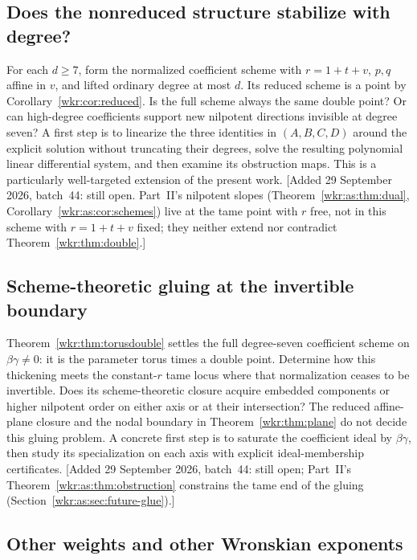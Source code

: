 \documentclass[11pt,a4paper]{article}
\numberwithin{equation}{section}
\theoremstyle{definition}
\theoremstyle{remark}
\begin{document}
\subsection{Does the nonreduced structure stabilize with degree?}
\label{wkr:as:q:stabilize}%

For each $d\ge7$, form the normalized coefficient scheme with
$r=1+t+v$, $p,q$ affine in $v$, and lifted ordinary degree at most $d$.
Its reduced scheme is a point by Corollary~\ref{wkr:cor:reduced}. Is the full
scheme always the same double point? Or can high-degree coefficients
support new nilpotent directions invisible at degree seven? A first step
is to linearize the three identities in $(A,B,C,D)$ around the explicit
solution without truncating their degrees, solve the resulting polynomial
linear differential system, and then examine its obstruction maps.
This is a particularly well-targeted extension of the present work.
[Added 29 September 2026, batch~44: still open. Part~II's nilpotent
slopes (Theorem~\ref{wkr:as:thm:dual},
Corollary~\ref{wkr:as:cor:schemes}) live at the tame point with $r$ free,
not in this scheme with $r=1+t+v$ fixed; they neither extend nor
contradict Theorem~\ref{wkr:thm:double}.]

\subsection{Scheme-theoretic gluing at the invertible boundary}
\label{wkr:as:q:gluing}%

Theorem~\ref{wkr:thm:torusdouble} settles the full degree-seven coefficient
scheme on $\beta\gamma\ne0$: it is the parameter torus times a double
point. Determine how this thickening meets the constant-$r$ tame locus
where that normalization ceases to be invertible. Does its scheme-theoretic
closure acquire embedded components or higher nilpotent order on either
axis or at their intersection? The reduced affine-plane closure and the
nodal boundary in Theorem~\ref{wkr:thm:plane} do not decide this gluing problem.
A concrete first step is to saturate the coefficient ideal by
$\beta\gamma$, then study its specialization on each axis with explicit
ideal-membership certificates.
[Added 29 September 2026, batch~44: still open; Part~II's
Theorem~\ref{wkr:as:thm:obstruction} constrains the tame end of the
gluing (Section~\ref{wkr:as:sec:future-glue}).]

\subsection{Other weights and other Wronskian exponents}
\end{document}

